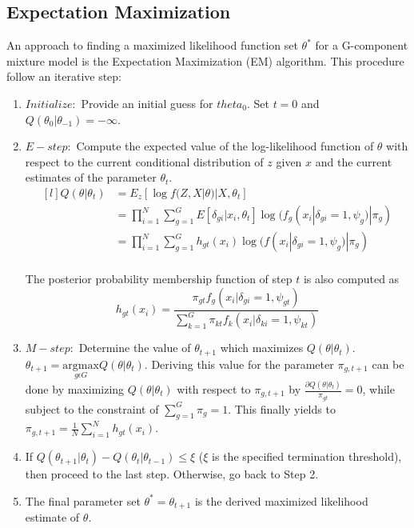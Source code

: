 \subsection{Expectation Maximization}
\label{sec:em}
An approach to finding a maximized likelihood function set \(\theta^*\) for a G-component mixture model is the Expectation Maximization (EM) algorithm. This procedure follow an iterative step:
\begin{enumerate}
    \item \(\mathit{Initialize: }\) Provide an initial guess for \(theta_0\). Set \(t=0\) and \(Q(\theta_0|\theta_{-1})=-\infty\).
    
    \item \(\mathit{E-step: }\) Compute the expected value of the log-likelihood function of \(\theta\) with respect to the current conditional distribution of \(z\) given \(x\) and the current estimates of the parameter \(\theta_t\).
    \[\begin{matrix*}[l]
        Q(\theta|\theta_t) & = E_z[\log f(Z,X|\theta) | X, \theta_t] \\ 
                           & = \prod_{i=1}^{N}\sum_{g=1}^{G}E[\delta_{gi}|x_i,\theta_t] \log(f_g(x_i|\delta_{gi}=1, \psi_g) | \pi_g) \\ 
                           & = \prod_{i=1}^{N}\sum_{g=1}^{G}h_{gt}(x_i) \log(f(x_i|\delta_{gi}=1, \psi_g) | \pi_g) \\ 
        \end{matrix*}\]
    
    The posterior probability membership function of step \(t\) is also computed as
        \[h_{gt}(x_i) = \frac{\pi_{gt}f_g(x_i|\delta_{gi}=1,\psi_{gt})}{\sum_{k=1}^{G}\pi_{kt}f_k(x_i|\delta_{ki}=1,\psi_{kt})}\]

    \item \(\mathit{M-step: }\) Determine the value of \(\theta_{t+1}\) which maximizes \(Q(\theta|\theta_t)\). \(\theta_{t+1}=\underset{g\epsilon G}{\mathrm{argmax}}{Q(\theta|\theta_t)}\). Deriving this value for the parameter \(\pi_{g,t+1}\) can be done by maximizing \(Q(\theta|\theta_t)\) with respect to \(\pi_{g,t+1}\) by \(\frac{\partial Q(\theta|\theta_t)}{\pi_{gt}}=0\), while subject to the constraint of \(\sum_{g=1}^{G}\pi_g=1\). This finally yields to \(\pi_{g,t+1}=\frac{1}{N}\sum_{i=1}^{N}h_{gt}(x_i)\).

    \item If \(Q(\theta_{t+1}|\theta_{t}) - Q(\theta_{t}|\theta_{t-1}) \le \xi \) (\(\xi \) is the specified termination threshold), then proceed to the last step. Otherwise, go back to Step 2.
    
    \item The final parameter set \(\theta^* = \theta_{t+1}\) is the derived maximized likelihood estimate of \(\theta\).
\end{enumerate}

